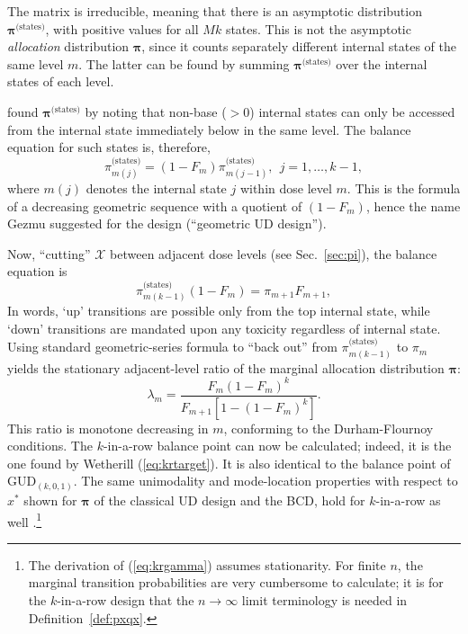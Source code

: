 The matrix is irreducible, meaning that there is an asymptotic distribution $\boldsymbol{\pi}^{\textrm{(states)}}$, with positive values for all $Mk$ states. This is not the asymptotic \emph{allocation} distribution $\boldsymbol{\pi}$, since it counts separately different internal states of the same level $m$. The latter can be found by summing $\boldsymbol{\pi}^{\textrm{(states)}}$ over the internal states of each level.

\cite{Gezm:Geom:1996} found  $\boldsymbol{\pi}^{\textrm{(states)}}$ by noting that non-base ($>0$) internal states can only be accessed from the internal state immediately below in the same level. The balance equation for such states is, therefore,
%
\begin{equation}\label{eq:kinternal}
\pi^{\textrm{(states)}}_{m(j)}=\left(1-F_m\right)\pi^{\textrm{(states)}}_{m(j-1)},\ \ j=1,\ldots,k-1,
\end{equation}
\noindent where $m(j)$ denotes the internal state $j$ within dose level $m$. This is the formula of a decreasing geometric sequence with a quotient of $\left(1-F_m\right)$, hence the name Gezmu suggested for the design (``geometric UD design'').

Now, ``cutting'' $\mathcal{X}$ between adjacent dose levels (see Sec.~\ref{sec:pi}), the balance equation is
%
\begin{equation}\label{eq:kexternal}
\pi^{\textrm{(states)}}_{m(k-1)}\left(1-F_m\right)=\pi_{m+1}F_{m+1},
\end{equation}
%
\noindent In words, `up' transitions are possible only from the top internal state, while `down' transitions are mandated upon any toxicity regardless of internal state. Using standard geometric-series formula to ``back out'' from $\pi^{\textrm{(states)}}_{m(k-1)}$ to $\pi_m$ yields the stationary adjacent-level ratio of the marginal allocation distribution $\boldsymbol{\pi}$:
%
\begin{equation}\label{eq:krgamma}
\lambda_m=\frac{F_m\left(1-F_m\right)^{k}}{F_{m+1}\left[1-\left(1-F_m\right)^{k}\right]}.
\end{equation}
%
This ratio is monotone decreasing in $m$, conforming to the Durham-Flournoy conditions. The $k$-in-a-row balance point can now be calculated; indeed, it is the one found by Wetherill (\ref{eq:krtarget}). It is also identical to the balance point of GUD$_{(k,0,1)}$. The same unimodality and mode-location properties with respect to $x^*$ shown for $\boldsymbol{\pi}$ of the classical UD design and the BCD, hold for $k$-in-a-row as well \citep{Oron:Hoff:thek:2009}.\footnote{The derivation of (\ref{eq:krgamma}) assumes stationarity. For finite $n$, the marginal transition probabilities are very cumbersome to calculate; it is for the $k$-in-a-row design that the $n\to\infty$ limit terminology is needed in Definition~\ref{def:pxqx}.}


